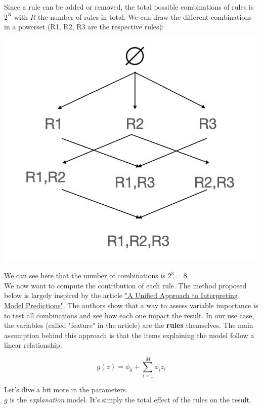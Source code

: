 Since a rule can be added or removed, the total possible combinations of rules is $2^R$ with $R$ the number of rules in total. We can draw the different combinations in a powerset (R1, R2, R3 are the respective rules):

\begin{center}
\includegraphics[scale=0.6]{./../img/powerset.png}
\end{center}

We can see here that the number of combinations is $2^3 = 8$. \\

We now want to compute the contribution of each rule. The method proposed below is largely inspired by the article \href{https://arxiv.org/pdf/1705.07874.pdf}{"A Unified Approach to Interpreting Model Predictions"}. The authors show that a way to assess variable importance is to test all combinations and see how each one impact the result. In our use case, the variables (called "feature" in the article) are the \textbf{rules} themselves. The main assumption behind this approach is that the items explaining the model follow a linear relationship:

$$g(z) = \phi_0 + \sum_{i=1}^M \phi_i z_i$$

Let's dive a bit more in the parameters. \\

$g$ is the \textit{explanation} model. It's simply the total effect of the rules on the result.

